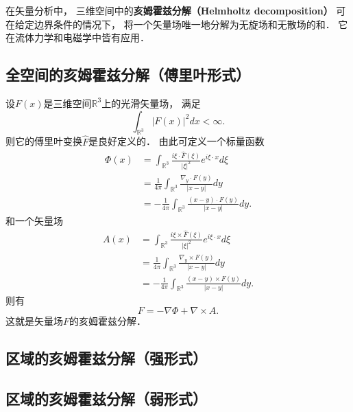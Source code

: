 
\begin{issues}
\issueDraft
\end{issues}


在矢量分析中， 三维空间中的\textbf{亥姆霍兹分解（Helmholtz decomposition）} 可在给定边界条件的情况下， 将一个矢量场唯一地分解为无旋场和无散场的和． 它在流体力学和电磁学中皆有应用．

\subsection{全空间的亥姆霍兹分解（傅里叶形式）}
设$F(x)$是三维空间$\mathbb{R}^3$上的光滑矢量场， 满足
$$
\int_{\mathbb{R}^3}|F(x)|^2dx<\infty.
$$
则它的傅里叶变换$\hat F$是良好定义的． 由此可定义一个标量函数
$$
\begin{aligned}
\Phi(x)
&=\int_{\mathbb{R}^3}\frac{i\xi\cdot\hat F(\xi)}{|\xi|^2}e^{i\xi\cdot x}d\xi\\
&=\frac{1}{4\pi}\int_{\mathbb{R}^3}\frac{\nabla_y\cdot F(y)}{|x-y|}dy\\
&=-\frac{1}{4\pi}\int_{\mathbb{R}^3}\frac{(x-y)\cdot F(y)}{|x-y|}dy.
\end{aligned}
$$
和一个矢量场
$$
\begin{aligned}
A(x)
&=\int_{\mathbb{R}^3}\frac{i\xi\times\hat F(\xi)}{|\xi|^2}e^{i\xi\cdot x}d\xi\\
&=\frac{1}{4\pi}\int_{\mathbb{R}^3}\frac{\nabla_y\times F(y)}{|x-y|}dy\\
&=-\frac{1}{4\pi}\int_{\mathbb{R}^3}\frac{(x-y)\times F(y)}{|x-y|}dy.
\end{aligned}
$$
则有
$$
F=-\nabla\Phi+\nabla\times A.
$$
这就是矢量场$F$的亥姆霍兹分解．

\subsection{区域的亥姆霍兹分解（强形式）}

\subsection{区域的亥姆霍兹分解（弱形式）}
